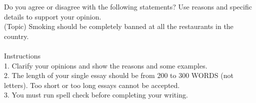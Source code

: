\begin{prompt}[title={Prompt \thetcbcounter: SMK task prompt}]
Do you agree or disagree with the following statements? Use reasons and specific details to support your opinion. \\
(Topic) Smoking should be completely banned at all the restaurants in the country.\\ \\
Instructions \\
1. Clarify your opinions and show the reasons and some examples.\\
2. The length of your single essay should be from 200 to 300 WORDS (not letters). Too short or too long essays cannot be accepted. \\
3. You must run spell check before completing your writing. \\
\end{prompt}    